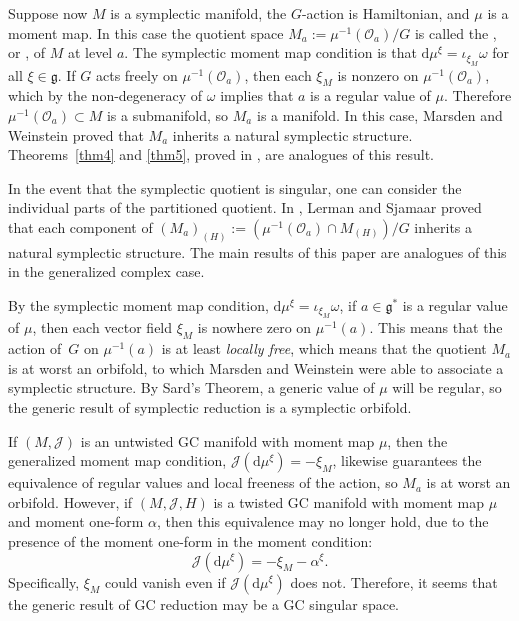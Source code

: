 Suppose now $M$ is a symplectic manifold, the $G$-action is Hamiltonian, and $\mu$ is a moment map.  In this case the quotient space $M_a := \mu^{-1}(\mathcal{O}_a) / G$ is called the , or , of $M$ at level $a$.
The symplectic moment map condition is that $\mathrm{d} \mu^{\xi} = \iota_{\xi_M} \omega$ for all $\xi \in \mathfrak{g}$.  If $G$ acts freely on $\mu^{-1}(\mathcal{O}_a)$, then each $\xi_M$ is nonzero on $\mu^{-1}(\mathcal{O}_a)$, which by the non-degeneracy of $\omega$ implies that $a$ is a regular value of $\mu$.  Therefore $\mu^{-1}(\mathcal{O}_a) \subset M$ is a submanifold, so $M_a$ is a manifold.  In this case, Marsden and Weinstein proved that $M_a$ inherits a natural symplectic structure.  Theorems~\ref{thm4} and \ref{thm5}, proved in \cite{lintolman}, are analogues of this result.

In the event that the symplectic quotient is singular, one can consider the individual parts of the partitioned quotient.
In \cite{stratified}, Lerman and Sjamaar proved that each component of $\left( M_{a} \right)_{(H)} := \left( \mu^{-1}(\mathcal{O}_a) \cap M_{(H)} \right) / G$ inherits a natural symplectic structure.
The main results of this paper are analogues of this in the generalized complex case.


\begin{Remark} \label{rem3}
By the symplectic moment map condition, $\mathrm{d} \mu^{\xi} = \iota_{\xi_M} \omega$, if $a \in \mathfrak{g}^*$ is a regular value of $\mu$, then each vector f\/ield $\xi_M$ is nowhere zero on $\mu^{-1}(a)$.  This means that the action of~$G$ on $\mu^{-1}(a)$ is at least \emph{locally free}, which means that the quotient $M_a$ is at worst an orbifold, to which Marsden and Weinstein were able to associate a symplectic structure.  By Sard's Theorem, a generic value of $\mu$ will be regular, so the generic result of symplectic reduction is a symplectic orbifold.

If $(M,\mathcal{J})$ is an untwisted GC manifold with moment map $\mu$, then the generalized moment map condition, $\mathcal{J}(\mathrm{d} \mu^{\xi}) = -\xi_M$, likewise guarantees the equivalence of regular values and local freeness of the action, so $M_a$ is at worst an orbifold.  However, if $(M,\mathcal{J},H)$ is a twisted GC manifold with moment map $\mu$ and moment one-form $\alpha$, then this equivalence may no longer hold, due to the presence of the moment one-form in the moment condition:
\[
  \mathcal{J}(\mathrm{d} \mu^{\xi}) = -\xi_M - \alpha^{\xi}.
\]
Specif\/ically, $\xi_M$ could vanish even if $\mathcal{J}(\mathrm{d} \mu^{\xi})$ does not.  Therefore, it seems that the generic result of GC reduction may be a GC singular space.
\end{Remark}


